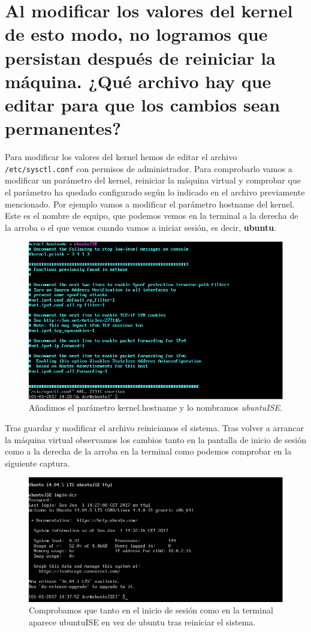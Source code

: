 \section{Al modificar los valores del kernel de esto modo, no logramos que persistan después de reiniciar la máquina. ¿Qué archivo hay que editar para que los cambios sean permanentes?}
Para modificar los valores del kernel hemos de editar el archivo \verb|/etc/sysctl.conf| \cite{c1} con permisos de administrador.
Para comprobarlo vamos a modificar un parámetro del kernel, reiniciar la máquina virtual y comprobar que el parámetro ha quedado configurado según lo indicado en el archivo previamente mencionado.
Por ejemplo vamos a modificar el parámetro hostname del kernel. Este es el nombre de equipo, que podemos vemos en la terminal a la derecha de la arroba o el que vemos cuando vamos a iniciar sesión, es decir, \textbf{ubuntu}.
\begin{figure}[H]
	\centering
	\includegraphics[scale=0.4]{modifySysctl.png}
	\caption{Añadimos el parámetro kernel.hostname y lo nombramos \textit{ubuntuISE}.}
\end{figure}
Tras guardar y modificar el archivo reiniciamos el sistema. Tras volver a arrancar la máquina virtual observamos los cambios tanto en la pantalla de inicio de sesión como a la derecha de la arroba en la terminal como podemos comprobar en la siguiente captura.
\begin{figure}[H]
	\centering
	\includegraphics[scale=0.4]{testSysctl.png}
	\caption{Comprobamos que tanto en el inicio de sesión como en la terminal aparece ubuntuISE en vez de ubuntu tras reiniciar el sistema.}
\end{figure}
